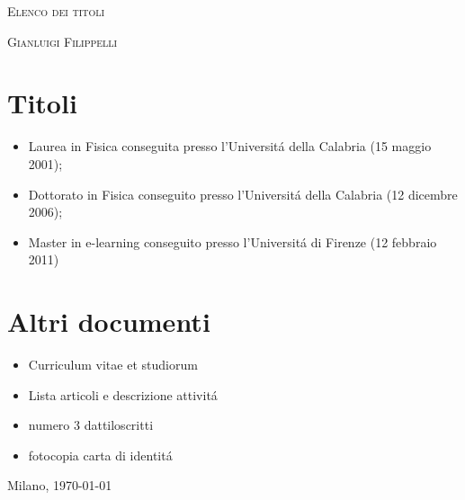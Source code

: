 \documentclass[a4paper,latin1,italian]{article}
\begin{document}
\pagestyle{empty}

\begin{center}
\huge{\textsc{Elenco dei titoli}}
\vspace{\baselineskip}
	
	\Large{\textsc{Gianluigi Filippelli}}
\end{center}
\vspace{1.5\baselineskip}

\section{Titoli}
\begin{itemize}
	\item Laurea in Fisica conseguita presso l'Universit\'a della Calabria (15 maggio 2001);
	\item Dottorato in Fisica conseguito presso l'Universit\'a della Calabria (12 dicembre 2006);
	\item Master in e-learning conseguito presso l'Universit\'a di Firenze (12 febbraio 2011)
\end{itemize}
%
\section{Altri documenti}
\begin{itemize}
	\item Curriculum vitae et studiorum
	\item Lista articoli e descrizione attivit\'a
	\item numero 3 dattiloscritti
	\item fotocopia carta di identit\'a
\end{itemize}
%
\vspace{2\baselineskip}
\noindent Milano, \today
\end{document}
